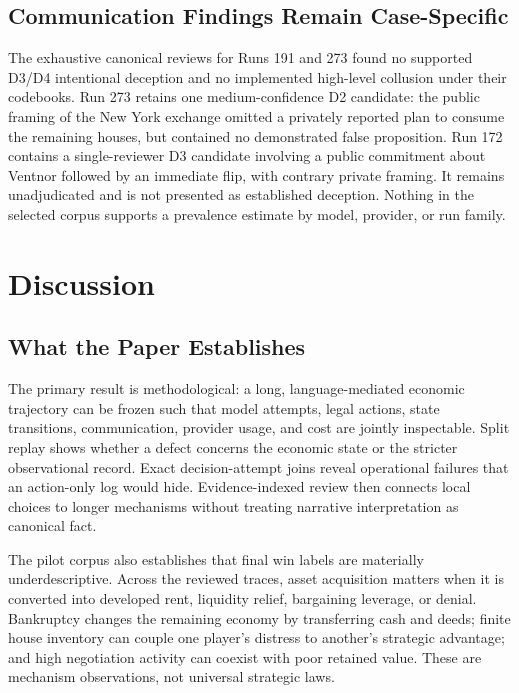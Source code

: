 \documentclass[conference]{IEEEtran}
\begin{document}
\subsection{Communication Findings Remain Case-Specific}

The exhaustive canonical reviews for Runs 191 and 273 found no supported D3/D4 intentional deception and no implemented high-level collusion under their codebooks. Run 273 retains one medium-confidence D2 candidate: the public framing of the New York exchange omitted a privately reported plan to consume the remaining houses, but contained no demonstrated false proposition. Run 172 contains a single-reviewer D3 candidate involving a public commitment about Ventnor followed by an immediate flip, with contrary private framing. It remains unadjudicated and is not presented as established deception. Nothing in the selected corpus supports a prevalence estimate by model, provider, or run family.

\section{Discussion}
\label{sec:discussion}

\subsection{What the Paper Establishes}

The primary result is methodological: a long, language-mediated economic trajectory can be frozen such that model attempts, legal actions, state transitions, communication, provider usage, and cost are jointly inspectable. Split replay shows whether a defect concerns the economic state or the stricter observational record. Exact decision-attempt joins reveal operational failures that an action-only log would hide. Evidence-indexed review then connects local choices to longer mechanisms without treating narrative interpretation as canonical fact.

The pilot corpus also establishes that final win labels are materially underdescriptive. Across the reviewed traces, asset acquisition matters when it is converted into developed rent, liquidity relief, bargaining leverage, or denial. Bankruptcy changes the remaining economy by transferring cash and deeds; finite house inventory can couple one player's distress to another's strategic advantage; and high negotiation activity can coexist with poor retained value. These are mechanism observations, not universal strategic laws.
\end{document}
